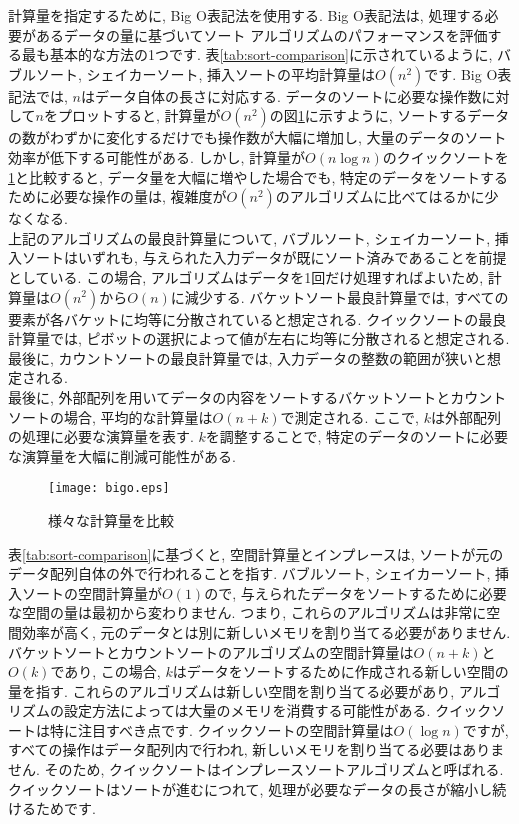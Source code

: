 \documentclass[a4j, 12pt]{jarticle}
\begin{document}
計算量を指定するために, Big O表記法を使用する. Big O表記法は, 処理する必要があるデータの量に基づいてソート アルゴリズムのパフォーマンスを評価する最も基本的な方法の1つです. 表\ref{tab:sort-comparison}に示されているように, バブルソート, シェイカーソート, 挿入ソートの平均計算量は$O(n^2)$です. Big O表記法では, $n$はデータ自体の長さに対応する. データのソートに必要な操作数に対して$n$をプロットすると, 計算量が$O(n^2)$の図\ref{bigograph}に示すように, ソートするデータの数がわずかに変化するだけでも操作数が大幅に増加し, 大量のデータのソート効率が低下する可能性がある. しかし, 計算量が$O(n \log n)$のクイックソートを\ref{bigograph}と比較すると, データ量を大幅に増やした場合でも, 特定のデータをソートするために必要な操作の量は, 複雑度が$O(n^2)$のアルゴリズムに比べてはるかに少なくなる.\\

上記のアルゴリズムの最良計算量について, バブルソート, シェイカーソート, 挿入ソートはいずれも, 与えられた入力データが既にソート済みであることを前提としている. この場合, アルゴリズムはデータを1回だけ処理すればよいため, 計算量は$O(n^2)$から$O(n)$に減少する. バケットソート最良計算量では, すべての要素が各バケットに均等に分散されていると想定される. クイックソートの最良計算量では, ピボットの選択によって値が左右に均等に分散されると想定される. 最後に, カウントソートの最良計算量では, 入力データの整数の範囲が狭いと想定される. \\

最後に, 外部配列を用いてデータの内容をソートするバケットソートとカウントソートの場合, 平均的な計算量は$O(n + k)$で測定される. ここで, $k$は外部配列の処理に必要な演算量を表す. $k$を調整することで, 特定のデータのソートに必要な演算量を大幅に削減可能性がある.\\

\begin{figure}[H]
  \centering
  \texttt{[image: bigo.eps]}
  \caption{様々な計算量を比較}\label{bigograph}
\end{figure}

表\ref{tab:sort-comparison}に基づくと, 空間計算量とインプレースは, ソートが元のデータ配列自体の外で行われることを指す. バブルソート, シェイカーソート, 挿入ソートの空間計算量が$O(1)$ので, 与えられたデータをソートするために必要な空間の量は最初から変わりません. つまり, これらのアルゴリズムは非常に空間効率が高く, 元のデータとは別に新しいメモリを割り当てる必要がありません. バケットソートとカウントソートのアルゴリズムの空間計算量は$O(n + k)$と$O(k)$であり, この場合, $k$はデータをソートするために作成される新しい空間の量を指す. これらのアルゴリズムは新しい空間を割り当てる必要があり, アルゴリズムの設定方法によっては大量のメモリを消費する可能性がある. クイックソートは特に注目すべき点です. クイックソートの空間計算量は$O(\log n)$ですが, すべての操作はデータ配列内で行われ, 新しいメモリを割り当てる必要はありません. そのため, クイックソートはインプレースソートアルゴリズムと呼ばれる. クイックソートはソートが進むにつれて, 処理が必要なデータの長さが縮小し続けるためです.\\
\end{document}
